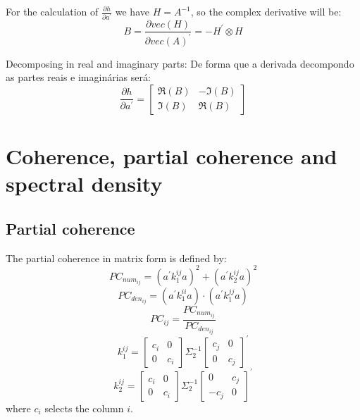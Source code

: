 \documentclass[a4paper,10pt]{article}
\begin{document}
For the calculation of  $\frac{\partial h}{\partial a^{'}}$ we have $H = A^{-1}$, so the complex derivative will be:
\begin{equation}
B = \frac{\partial vec(H)}{\partial vec(A)^{'}} = -H^{'} \otimes H
\end{equation}

Decomposing in real and imaginary parts:
De forma que a derivada decompondo as partes reais e imaginárias será:
\begin{equation}
\frac{\partial h}{\partial a^{'}} = \left[ \begin{array}{cc} \Re(B) & -\Im(B) \\ \Im(B) & \Re(B)
\end{array} \right]
\end{equation}

\section{Coherence, partial coherence and spectral density}

\subsection{Partial coherence}

The partial coherence in matrix form is defined by:
\begin{equation}
PC_{num_{ij}} = \left( a^{'} k_{1}^{ij} a \right)^{2} + \left( a^{'} k_{2}^{ij} a \right)^{2}
\end{equation}
\begin{equation}
PC_{den_{ij}} = \left( a^{'} k_{1}^{ii} a \right) \cdot \left( a^{'} k_{1}^{jj} a \right)
\end{equation}
\begin{equation}
PC_{ij} = \frac{PC_{num_{ij}}}{PC_{den_{ij}}}
\end{equation}
\begin{equation}
k_{1}^{ij} = \left[ \begin{array}{cc}
 c_{i} & 0 \\ 0 & c_{i}
\end{array} \right] \Sigma_{2}^{-1} \left[ \begin{array}{cc}
 c_{j} & 0 \\ 0 & c_{j}
\end{array} \right]^{'}
\end{equation}
\begin{equation}
k_{2}^{ij} = \left[ \begin{array}{cc}
 c_{i} & 0 \\ 0 & c_{i}
\end{array} \right] \Sigma_{2}^{-1} \left[ \begin{array}{cc}
 0 & c_{j} \\ -c_{j} & 0
\end{array} \right]^{'} 
\end{equation}
where $c_i$ selects the column $i$. 
\end{document}
